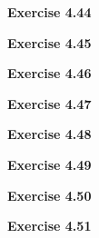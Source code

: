 \documentclass{article}
\begin{document}
\bigskip

\begin{framed}
    \noindent \textbf{Exercise 4.44}
    
    \medskip
    
    
\end{framed}


\bigskip

\begin{framed}
    \noindent \textbf{Exercise 4.45}
    
    \medskip
    
    
\end{framed}


\bigskip

\begin{framed}
    \noindent \textbf{Exercise 4.46}
    
    \medskip
    
    
\end{framed}


\bigskip

\begin{framed}
    \noindent \textbf{Exercise 4.47}
    
    \medskip
    
    
\end{framed}


\bigskip

\begin{framed}
    \noindent \textbf{Exercise 4.48}
    
    \medskip
    
    
\end{framed}


\bigskip

\begin{framed}
    \noindent \textbf{Exercise 4.49}
    
    \medskip
    
    
\end{framed}


\bigskip

\begin{framed}
    \noindent \textbf{Exercise 4.50}
    
    \medskip
    
    
\end{framed}


\bigskip

\begin{framed}
    \noindent \textbf{Exercise 4.51}
    
    \medskip
    
    
\end{framed}
\end{document}
